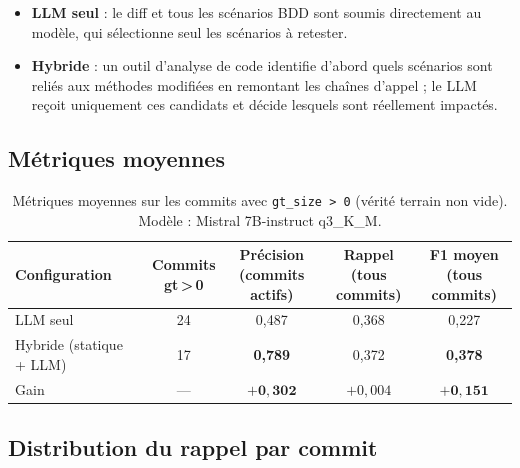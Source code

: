 \documentclass[12pt,a4paper]{article}
\begin{document}
\begin{itemize}[noitemsep]
  \item \textbf{LLM seul} : le diff et tous les scénarios BDD sont soumis
        directement au modèle, qui sélectionne seul les scénarios à retester.
  \item \textbf{Hybride} : un outil d'analyse de code identifie d'abord
        quels scénarios sont reliés aux méthodes modifiées en remontant
        les chaînes d'appel ; le LLM reçoit uniquement ces candidats
        et décide lesquels sont réellement impactés.
\end{itemize}

\subsection{Métriques moyennes}

\begin{table}[H]
\centering
\begin{tabular}{lcccc}
\toprule
\textbf{Configuration}
  & \makecell{\textbf{Commits}\\\textbf{gt\,>\,0}}
  & \makecell{\textbf{Précision}\\\small(commits actifs)}
  & \makecell{\textbf{Rappel}\\\small(tous commits)}
  & \makecell{\textbf{F1 moyen}\\\small(tous commits)} \\
\midrule
LLM seul                 & 24 & 0{,}487 & 0{,}368 & 0{,}227 \\
Hybride (statique + LLM) & 17 & \textbf{0{,}789} & 0{,}372 & \textbf{0{,}378} \\
\midrule
Gain                     & --- & $\mathbf{+0{,}302}$ & $+0{,}004$ & $\mathbf{+0{,}151}$ \\
\bottomrule
\end{tabular}
\caption{Métriques moyennes sur les commits avec \texttt{gt\_size > 0}
         (vérité terrain non vide). Modèle : Mistral 7B-instruct q3\_K\_M.}
\label{tab:resultats}
\end{table}

\subsection{Distribution du rappel par commit}
\end{document}
